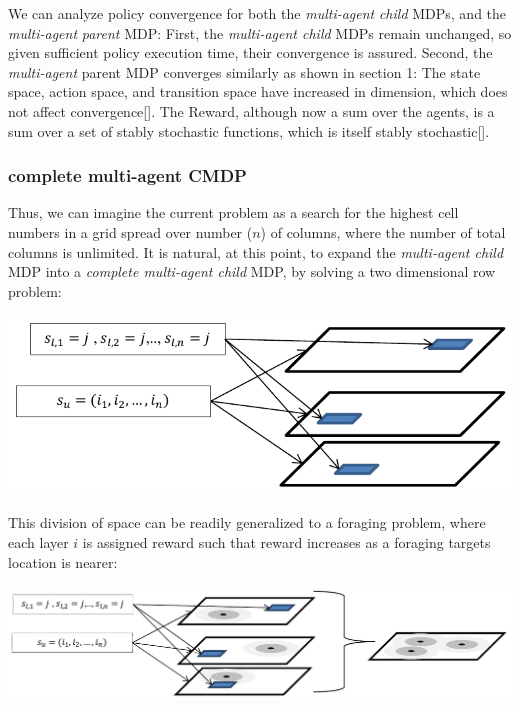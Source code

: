 \documentclass[compsoc,journal,letterpaper,10pt,draftclsnofoot,onecolumn]{IEEEtran}
\begin{document}
We can analyze policy convergence for both the \emph{multi-agent}
\emph{child} MDPs, and the \emph{multi-agent} \emph{parent} MDP: First,
the \emph{multi-agent child} MDPs remain unchanged, so given sufficient
policy execution time, their convergence is assured. Second, the
\emph{multi-agent} parent MDP converges similarly as shown in section 1:
The state space, action space, and transition space have increased in
dimension, which does not affect convergence{[}{]}. The Reward, although
now a sum over the agents, is a sum over a set of stably stochastic
functions, which is itself stably stochastic{[}{]}.

\subsubsection{complete multi-agent
CMDP}\label{complete-multi-agent-cmdp}

Thus, we can imagine the current problem as a search for the highest
cell numbers in a grid spread over number (\(n\)) of columns, where the
number of total columns is unlimited. It is natural, at this point, to
expand the \emph{multi-agent child} MDP into a \emph{complete
multi-agent child} MDP, by solving a two dimensional row problem:

\includegraphics{media/figure9}
 
This division of space can be readily generalized to a foraging problem,
where each layer \(i\) is assigned reward such that reward increases as
a foraging targets location is nearer:

\includegraphics{media/figure10}

\subsubsection{}\label{section}
\end{document}
